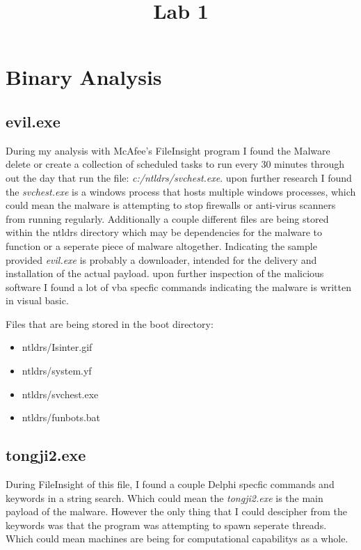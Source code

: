 \documentclass[letterpaper,12pt,titlepage,onecolumn]{IEEEtran}
\author{\name}
\title{Lab 1}
\begin{document}
\maketitle
\hrulefill

\section{Binary Analysis}
\subsection{evil.exe}
During my analysis with McAfee's FileInsight program I found the Malware delete or create a collection of scheduled tasks to run every 30 minutes through out the day that run the file: \textit{c:/ntldrs/svchest.exe}. upon further research I found the \textit{svchest.exe} is a windows process that hosts multiple windows processes, which could mean the malware is attempting to stop firewalls or anti-virus scanners from running regularly. Additionally a couple different files are being stored within the ntldrs directory which may be dependencies for the malware to function or a seperate piece of malware altogether. Indicating the sample provided \textit{evil.exe} is probably a downloader, intended for the delivery and installation of the actual payload. upon further inspection of the malicious software I found a lot of vba specfic commands indicating the malware is written in visual basic. \par
Files that are being stored in the boot directory:
\begin{itemize}
    \item ntldrs/Isinter.gif
    \item ntldrs/system.yf
    \item ntldrs/svchest.exe
    \item ntldrs/funbots.bat
\end{itemize}


\subsection{tongji2.exe}
During FileInsight of this file, I found a couple Delphi specfic commands and keywords in a string search. Which could mean the \textit{tongji2.exe} is the main payload of the malware. However the only thing that I could descipher from the keywords was that the program was attempting to spawn seperate threads. Which could mean machines are being for computational capabilitys as a whole.
\end{document}
